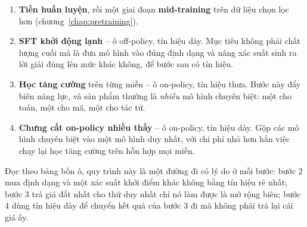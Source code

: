 \begin{enumerate}
	\item \textbf{Tiền huấn luyện}, rồi một giai đoạn \textbf{mid-training} trên dữ liệu chọn lọc hơn (chương~\ref{chap:pretraining}).
	\item \textbf{SFT khởi động lạnh} -- ô off-policy, tín hiệu dày. Mục tiêu không phải chất lượng cuối mà là đưa mô hình vào đúng định dạng và nâng xác suất sinh ra lời giải đúng lên mức khác không, để bước sau có tín hiệu.
	\item \textbf{Học tăng cường} trên từng miền -- ô on-policy, tín hiệu thưa. Bước này đẩy biên năng lực, và sản phẩm thường là \emph{nhiều} mô hình chuyên biệt: một cho toán, một cho mã, một cho tác tử.
	\item \textbf{Chưng cất on-policy nhiều thầy} -- ô on-policy, tín hiệu dày. Gộp các mô hình chuyên biệt vào một mô hình duy nhất, với chi phí nhỏ hơn hẳn việc chạy lại học tăng cường trên hỗn hợp mọi miền.
\end{enumerate}

Đọc theo bảng bốn ô, quy trình này là một đường đi có lý do ở mỗi bước: bước 2 mua định dạng và một xác suất khởi điểm khác không bằng tín hiệu rẻ nhất; bước 3 trả giá đắt nhất cho thứ duy nhất chỉ nó làm được là mở rộng biên; bước 4 dùng tín hiệu dày để chuyển kết quả của bước 3 đi mà không phải trả lại cái giá ấy.
